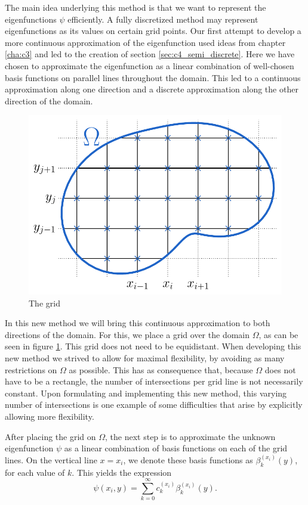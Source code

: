 The main idea underlying this method is that we want to represent the eigenfunctions $\psi$ efficiently. A fully discretized method may represent eigenfunctions as its values on certain grid points. Our first attempt to develop a more continuous approximation of the eigenfunction used ideas from chapter \ref{cha:c3} and led to the creation of section \ref{sec:c4_semi_discrete}. Here we have chosen to approximate the eigenfunction as a linear combination of well-chosen basis functions on parallel lines throughout the domain. This led to a continuous approximation along one direction and a discrete approximation along the other direction of the domain.

\begin{figure}
    \begin{center}
        \includegraphics[width=.8\linewidth]{img/chapter4/the_method_grid.pdf}
        \caption{\label{fig:woven_method_grid} The grid}
    \end{center}
\end{figure}

In this new method we will bring this continuous approximation to both directions of the domain. For this, we place a grid over the domain $\Omega$, as can be seen in figure \ref{fig:woven_method_grid}. This grid does not need to be equidistant. When developing this new method we strived to allow for maximal flexibility, by avoiding as many restrictions on $\Omega$ as possible. This has as consequence that, because $\Omega$ does not have to be a rectangle, the number of intersections per grid line is not necessarily constant. Upon formulating and implementing this new method, this varying number of intersections is one example of some difficulties that arise by explicitly allowing more flexibility.

After placing the grid on $\Omega$, the next step is to approximate the unknown eigenfunction $\psi$ as a linear combination of basis functions on each of the grid lines. On the vertical line $x = x_i$, we denote these basis functions as $\beta_k^{(x_i)}(y)$, for each value of $k$. This yields the expression
\begin{equation}\label{equ:c4_expression_on_lines_x}
    \psi(x_i, y) = \sum_{k=0}^\infty c_k^{(x_i)} \beta_k^{(x_i)}(y) \text{.}
\end{equation}

